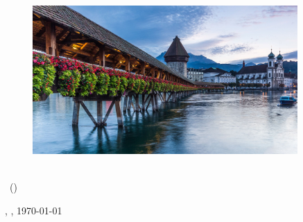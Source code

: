 \thispagestyle{empty}
 
\begin{flushleft}
\smallskip
\end{flushleft}

\begin{flushleft}
\vspace{10 mm}
\textbf{{\fontsize{35}{20}\selectfont {\titleDocument}}}
\end{flushleft}

\begin{flushleft}
\bigskip
\bigskip
\end{flushleft}

\begin{flushleft}
\documentAuthor
\vspace{40 mm}
\end{flushleft}


\begin{flushleft}
\textbf{{\fontsize{20}{20}\selectfont {\subjectDocument}}}
\end{flushleft}

\vspace{2 mm}

\begin{figure}[h!]
 \centering
 \includegraphics[width=0.9\textwidth]{../fig/placeholder}
\end{figure}

\vfill


\begin{flushleft}
\institutionNameLong \\
\titleDocument\ (\moduleAbbreviation) \\
\end{flushleft}

\begin{flushleft}
\institutionLocation, \institutionNameShort, \today\\
\end{flushleft}


\pagebreak
\thispagestyle{empty} %
\mbox{}
\newpage
\pagebreak